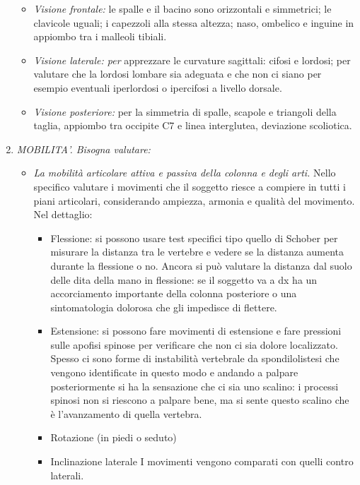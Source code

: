 \begin{enumerate}
\begin{itemize}
\item
  \emph{Visione frontale:} le spalle e il bacino sono orizzontali e
  simmetrici; le clavicole uguali; i capezzoli alla stessa altezza;
  naso, ombelico e inguine in appiombo tra i malleoli tibiali.
\item
  \emph{Visione l\emph{aterale: per}} apprezzare le curvature sagittali:
  cifosi e lordosi; per valutare che la lordosi lombare sia adeguata e
  che non ci siano per esempio eventuali iperlordosi o ipercifosi a
  livello dorsale.
\item
  \emph{Visione posteriore:} per la simmetria di spalle, scapole e
  triangoli della taglia, appiombo tra occipite C7 e linea interglutea,
  deviazione scoliotica.
\end{itemize}

\item
  \emph{MOBILITA'. Bisogna valutare:}


\begin{itemize}
\item
  \emph{La mobilità articolare attiva e passiva della colonna e degli
  arti.} Nello specifico valutare i movimenti che il soggetto riesce a
  compiere in tutti i piani articolari, considerando ampiezza, armonia e
  qualità del movimento. Nel dettaglio:

\begin{itemize}
\item
  Flessione: si possono usare test specifici tipo quello di Schober per
  misurare la distanza tra le vertebre e vedere se la distanza aumenta
  durante la flessione o no. Ancora si può valutare la distanza dal
  suolo delle dita della mano in flessione: se il soggetto va a dx ha un
  accorciamento importante della colonna posteriore o una sintomatologia
  dolorosa che gli impedisce di flettere.
\item
  Estensione: si possono fare movimenti di estensione e fare pressioni
  sulle apofisi spinose per verificare che non ci sia dolore
  localizzato. Spesso ci sono forme di instabilità vertebrale da
  spondilolistesi che vengono identificate in questo modo e andando a
  palpare posteriormente si ha la sensazione che ci sia uno scalino: i
  processi spinosi non si riescono a palpare bene, ma si sente questo
  scalino che è l'avanzamento di quella vertebra.
\item
  Rotazione (in piedi o seduto)
\item
  Inclinazione laterale I movimenti vengono comparati con quelli contro
  laterali.
\end{itemize}


\end{itemize}
\end{enumerate}
